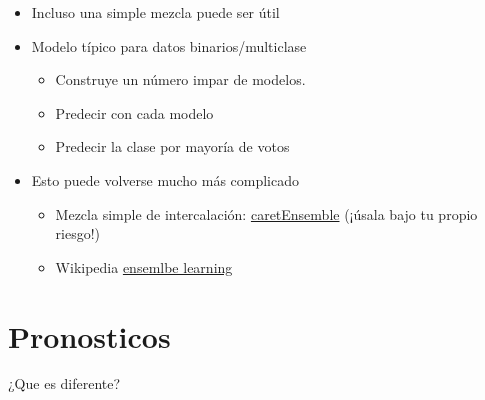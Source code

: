 \documentclass[
]{article}
\providecommand{\tightlist}{%
  \setlength{\itemsep}{0pt}\setlength{\parskip}{0pt}}
\begin{document}
\begin{itemize}
\tightlist
\item
  Incluso una simple mezcla puede ser útil
\item
  Modelo típico para datos binarios/multiclase

  \begin{itemize}
  \tightlist
  \item
    Construye un número impar de modelos.
  \item
    Predecir con cada modelo
  \item
    Predecir la clase por mayoría de votos
  \end{itemize}
\item
  Esto puede volverse mucho más complicado

  \begin{itemize}
  \tightlist
  \item
    Mezcla simple de intercalación:
    \href{https://github.com/zachmayer/caretEnsemble}{caretEnsemble}
    (¡úsala bajo tu propio riesgo!)
  \item
    Wikipedia
    \href{http://en.wikipedia.org/wiki/Ensemble_learning}{ensemlbe
    learning}
  \end{itemize}
\end{itemize}

\hypertarget{pronosticos}{%
\section{Pronosticos}\label{pronosticos}}

¿Que es diferente?
\end{document}
